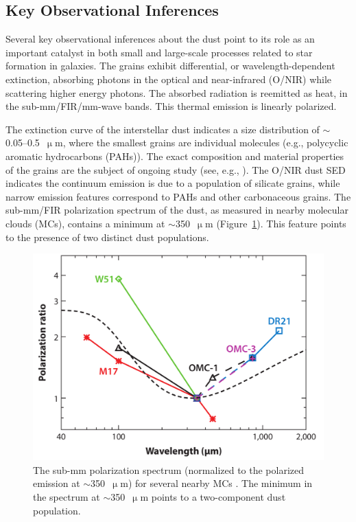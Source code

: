 \subsection{Key Observational Inferences}

Several key observational inferences about the dust point to its role as an important catalyst in both small and large-scale processes related to star formation in galaxies. The grains exhibit differential, or wavelength-dependent extinction, absorbing photons in the optical and near-infrared (O/NIR) while scattering higher energy photons. The absorbed radiation is reemitted as heat, in the sub-mm/FIR/mm-wave bands. This thermal emission is linearly polarized.

The extinction curve of the interstellar dust indicates a size distribution of $\sim$0.05--0.5~$\upmu$m, where the smallest grains are individual molecules (e.g., polycyclic aromatic hydrocarbons (PAHs)). The exact composition and material properties of the grains are the subject of ongoing study (see, e.g., \citet{andersson2015interstellar,draine2003interstellar}). The O/NIR dust SED indicates the continuum emission is due to a population of silicate grains, while narrow emission features correspond to PAHs and other carbonaceous grains. The sub-mm/FIR polarization spectrum of the dust, as measured in nearby molecular clouds (MCs), contains a minimum at $\sim$350~$\upmu$m (Figure~\ref{fig:polspec}). This feature points to the presence of two distinct dust populations.

\begin{figure}[!htbp]
\centering
\includegraphics[width=\textwidth]{figures/intro/polspec}
\caption[~The measured polarization spectrum of interstellar dust in several nearby MCs.]{The sub-mm polarization spectrum (normalized to the polarized emission at $\sim$350~$\upmu$m) for several nearby MCs \citep{andersson2015interstellar}. The minimum in the spectrum at $\sim$350~$\upmu$m points to a two-component dust population.}
\label{fig:polspec}
\end{figure}

